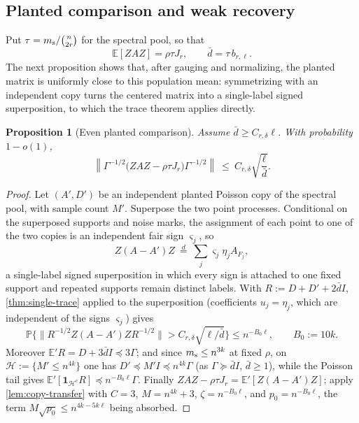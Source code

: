 \documentclass[11pt]{article}
\newtheorem{proposition}[proposition]{Proposition}
\theoremstyle{definition}
\theoremstyle{remark}
\newcommand{\E}{\mathbb E}
\newcommand{\bbP}{\mathbb P}
\newcommand{\1}{\mathbf 1}
\newcommand{\cH}{\mathcal H}
\newcommand{\bd}{\bar d}
\numberwithin{equation}{section}
\begin{document}
\subsection{Planted comparison and weak recovery}

Put $\tau=m_{\rm s}/\binom n{2r}$ for the spectral pool, so that
\begin{equation}\label{eq:even-population}
 \E[ZAZ]=\rho\tau J_r,
 \qquad
 \bd=\tau\,b_{r,\ell}.
\end{equation}
The next proposition shows that, after gauging and normalizing, the
planted matrix is uniformly close to this population mean: symmetrizing
with an independent copy turns the centered matrix into a single-label
signed superposition, to which the trace theorem applies directly.

\begin{proposition}[Even planted comparison]\label{prop:even-comparison}
Assume $\bd\ge C_{r,\delta}\ell$.  With
probability $1-o(1)$,
\begin{equation}\label{eq:even-comparison}
 \left\|\Gamma^{-1/2}\bigl(ZAZ-\rho\tau J_r\bigr)\Gamma^{-1/2}\right\|
 \ \le\ C_{r,\delta}\sqrt{\frac\ell\bd}.
\end{equation}
\end{proposition}
\begin{proof}
Let $(A',D')$ be an independent planted Poisson copy of the spectral
pool, with sample count $M'$.  Superpose the two point processes.
Conditional on the superposed supports and noise marks, the assignment of
each point to one of the two copies is an independent fair sign
$\varsigma_j$, so
\[
 Z(A-A')Z\ \overset{d}{=}\ \sum_j\varsigma_j\eta_jA_{F_j},
\]
a single-label signed superposition in which every sign is attached to
one fixed support and repeated supports remain distinct labels.  With
$R:=D+D'+2\bd I$, \cref{thm:single-trace} applied to the superposition
(coefficients $u_j=\eta_j$, which are independent of the signs
$\varsigma_j$) gives
\[
 \bbP\bigl\{\|R^{-1/2}Z(A-A')ZR^{-1/2}\|
 >C_{r,\delta}\sqrt{\ell/\bd}\bigr\}\le n^{-B_0\ell},
\qquad B_0:=10k.
\]
Moreover $\E'R=D+3\bd I\preceq3\Gamma$; and since
$m_{\rm s}\le n^{3k}$ at fixed $\rho$, on
$\cH:=\{M'\le n^{4k}\}$ one has
$D'\preceq M'I\preceq n^{4k}\Gamma$ (as $\Gamma\succeq\bd I$,
$\bd\ge1$), while the Poisson tail gives
$\E'[\1_{\cH^c}R]\preceq n^{-B_0\ell}\Gamma$.  Finally
$ZAZ-\rho\tau J_r=\E'[Z(A-A')Z]$; apply \cref{lem:copy-transfer} with
$C=3$, $M=n^{4k}+3$, $\zeta=n^{-B_0\ell}$, and $p_0=n^{-B_0\ell}$, the
term $M\sqrt{p_0}\le n^{4k-5k\ell}$ being absorbed.
\end{proof}
\end{document}
